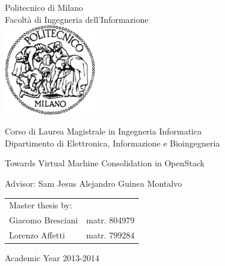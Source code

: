 \begin{titlepage}
\vspace*{-2.5cm}
\bfseries

\begin{center}
\LARGE
Politecnico di Milano\\
\Large
Facolt\`{a} di Ingegneria dell'Informazione\\
\vspace{0.5cm}
\includegraphics[width=4cm]{images/logo_polimi.png}
\vspace*{3cm}


\begin{large}
Corso di Laurea Magistrale in Ingegneria Informatica\\
Dipartimento di Elettronica, Informazione e Bioingegneria\\
\end{large}

\vspace{1.0cm}
\begin{Large}
Towards Virtual Machine Consolidation in OpenStack\\
\end{Large}  
\end{center}

\vspace*{1.5cm}
\large
\begin{flushleft}
\hspace{-2cm}  Advisor: Sam Jesus Alejandro Guinea Montalvo\\
\end{flushleft}
\vspace*{1.5cm}

\hspace{5.5cm}
\parbox{10cm}{
    \begin{tabular}{ll}
         Master thesis by: & \\
         Giacomo Bresciani & matr. 804979\\
         Lorenzo Affetti & matr. 799284 \\
    \end{tabular}
}

\vspace*{1.5cm}
\begin{center}
  Academic Year 2013-2014
\end{center}

\end{titlepage}
\cleardoublepage


